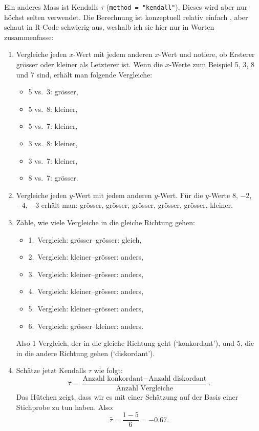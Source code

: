 \documentclass[oneside, 10pt]{book}\usepackage[]{graphicx}\usepackage[]{xcolor}
\begin{document}
Ein anderes Mass ist Kendalls $\tau$ (\texttt{method = "kendall"}).
Dieses wird aber nur höchst selten verwendet. Die Berechnung ist
konzeptuell relativ einfach \citep[siehe][]{Noether1981}, aber schaut in R-Code schwierig aus,
weshalb ich sie hier nur in Worten zusammenfasse:

\begin{enumerate}
 \item Vergleiche jeden $x$-Wert mit jedem anderen $x$-Wert und
 notiere, ob Ersterer grösser oder kleiner als Letzterer ist.
 Wenn die $x$-Werte zum Beispiel 5, 3, 8 und 7 sind,
 erhält man folgende Vergleiche:
 \begin{itemize}
  \item 5 vs.\ 3: grösser,
  \item 5 vs.\ 8: kleiner,
  \item 5 vs.\ 7: kleiner,
  \item 3 vs.\ 8: kleiner,
  \item 3 vs.\ 7: kleiner,
  \item 8 vs.\ 7: grösser.
 \end{itemize}
 \item Vergleiche jeden $y$-Wert mit jedem anderen $y$-Wert.
 Für die $y$-Werte 8, $-2$, $-4$, $-3$ erhält man:
 grösser, grösser, grösser, grösser, grösser, kleiner.
 \item Zähle, wie viele Vergleiche in die gleiche
 Richtung gehen:
 \begin{itemize}
  \item 1.~Vergleich: grösser--grösser: gleich,
  \item 2.~Vergleich: kleiner--grösser: anders,
  \item 3.~Vergleich: kleiner--grösser: anders,
  \item 4.~Vergleich: kleiner--grösser: anders,
  \item 5.~Vergleich: kleiner--grösser: anders,
  \item 6.~Vergleich: grösser--kleiner: anders.
 \end{itemize}
 Also 1 Vergleich, der in die gleiche Richtung geht (`konkordant'),
 und 5, die in die andere Richtung gehen (`diskordant').
 \item Schätze jetzt Kendalls $\tau$ wie folgt:
 \begin{equation*}
 \hat{\tau} = \frac{\textrm{Anzahl konkordant} - \textrm{Anzahl diskordant}}{\textrm{Anzahl Vergleiche}}.
 \end{equation*}
 Das Hütchen zeigt, dass wir es mit einer Schätzung auf der Basis
 einer Stichprobe zu tun haben.
 Also:
  \begin{equation*}
 \hat{\tau} = \frac{1 - 5}{6} = -0.67.
 \end{equation*}
\end{enumerate}
\end{document}
